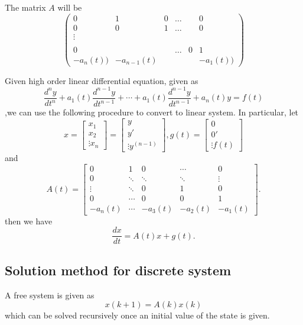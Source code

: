 \begin{refsection}
\begin{note}
The matrix $A$ will be
$$\begin{pmatrix}
0 & 1 & 0 & \dots &  & 0\\ 
0 & 0 & 1 & \dots &  & 0\\ 
\vdots &  &  &  &  & \\ 
 &  &  &  &  & \\ 
0 &  &  & \dots & 0 & 1\\ 
-a_n(t)) & -a_{n-1}(t) &  &  &  & -a_1(t)) 
\end{pmatrix}$$
\end{note}


\begin{note}
	Given high order linear differential equation, given as
$$\frac{d^n y}{dt^n} + a_1(t)\frac{d^{n-1} y}{dt^{n-1}} + \cdots + a_1(t)\frac{d^{n-1} y}{dt^{n-1}} + a_n(t)y = f(t) $$	
	,we can use the following procedure to convert to linear system. In particular, let
	$$x = \begin{bmatrix}
	x_1\\
	x_2\\
	\vdots
	x_n
	\end{bmatrix} = \begin{bmatrix}
	y\\
	y'\\
	\vdots
	y^{(n-1)}
	\end{bmatrix}, g(t) = \begin{bmatrix}
	0\\
	0'\\
	\vdots
	f(t)
	\end{bmatrix}$$
	and
	$$A(t)=\begin{bmatrix}
	0 & 1 & 0 & \cdots & 0\\ 
	0 & \ddots & \ddots & \ddots & \vdots\\ 
	\vdots & \ddots & 0 & 1 & 0\\ 
	0 & \cdots & 0 & 0 & 1\\ 
	-a_n(t) & \cdots & -a_3(t) & -a_2(t) & -a_1(t)
	\end{bmatrix}.$$
	then we have
	$$\frac{dx}{dt} = A(t)x + g(t).$$
\end{note}


\subsection{Solution method for discrete system}
\begin{definition}
A free system is given as 
$$x(k+1)=A(k)x(k)$$
which can be solved recursively once an initial value of the state is given.
\end{definition}


\end{refsection}
